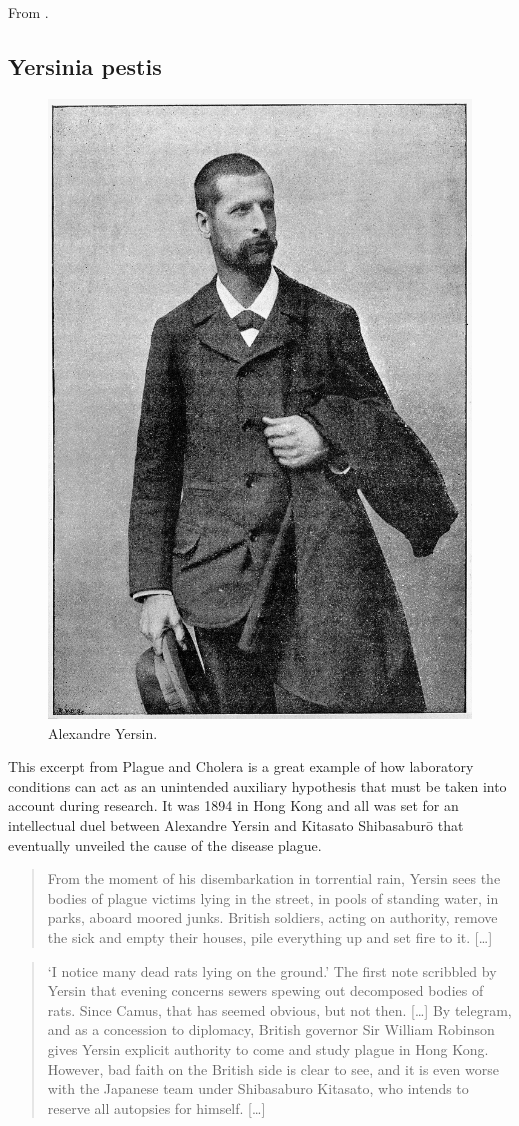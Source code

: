 \documentclass[
]{book}
\newenvironment{rnote}{\par\raggedleft}{\par}
\begin{document}
\begin{rnote}
From \citep{vega2021hume}.

\end{rnote}

\hypertarget{yersinia-pestis}{%
\subsection{Yersinia pestis}\label{yersinia-pestis}}

\begin{figure}  
 \begin{center}
    \includegraphics[width=.22\textwidth]{Figures/yersin.jpg}  
  \captionsetup{labelformat=empty}
  \caption{Alexandre Yersin.} 
\end{center}
\end{figure}
\addtocounter{figure}{-1}

This excerpt from Plague and Cholera is a great example of how laboratory conditions can act as an unintended auxiliary hypothesis that must be taken into account during research. It was 1894 in Hong Kong and all was set for an intellectual duel between Alexandre Yersin and Kitasato Shibasaburō that eventually unveiled the cause of the disease plague.

\begin{quote}
From the moment of his disembarkation in torrential rain, Yersin sees the bodies of plague victims lying in the street, in pools of standing water, in parks, aboard moored junks. British soldiers, acting on authority, remove the sick and empty their houses, pile everything up and set fire to it. {[}\ldots{]}
\end{quote}

\begin{quote}
`I notice many dead rats lying on the ground.' The first note scribbled by Yersin that evening concerns sewers spewing out decomposed bodies of rats. Since Camus, that has seemed obvious, but not then. {[}\ldots{]} By telegram, and as a concession to diplomacy, British governor Sir William Robinson gives Yersin explicit authority to come and study plague in Hong Kong. However, bad faith on the British side is clear to see, and it is even worse with the Japanese team under Shibasaburo Kitasato, who intends to reserve all autopsies for himself. {[}\ldots{]}
\end{quote}
\end{document}
